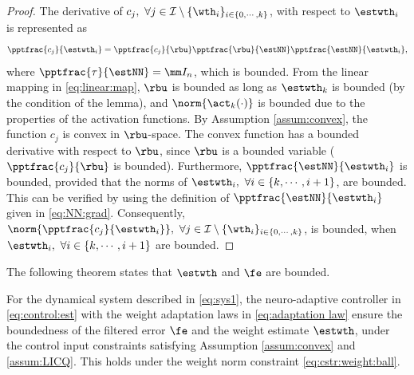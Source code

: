\documentclass[journal]{IEEEtran}
\begin{document}
\begin{proof}

The derivative of $c_j,\ \forall j\in\mathcal I \setminus \{\wth_i\}_{i\in\{0,\cdots,k\}}$, with respect to $\estwth_i$ is represented as
\begin{equation}
    \pptfrac{c_j}{\estwth_i} 
    = 
    \pptfrac{c_j}{\rbu} 
    \pptfrac{\rbu}{\estNN} 
    \pptfrac{\estNN}{\estwth_i}
    ,
\end{equation}
where $\pptfrac{\tau}{\estNN}=\mm I_n$, which is bounded. 
From the linear mapping in \eqref{eq:linear:map}, $\rbu$ is bounded as long as $\estwth_k$ is bounded (by the condition of the lemma), and $\norm{\act_k(\cdot)}$ is bounded due to the properties of the activation functions. 
By Assumption \ref{assum:convex}, the function $c_j$ is convex in $\rbu$-space.
The convex function has a bounded derivative with respect to $\rbu$, since $\rbu$ is a bounded variable (\ie $\pptfrac{c_j}{\rbu}$ is bounded). 
Furthermore, $\pptfrac{\estNN}{\estwth_i}$ is bounded, provided that the norms of $\estwth_i,\ \forall i \in\{k,\cdots,i+1\}$, are bounded. 
This can be verified by using the definition of $\pptfrac{\estNN}{\estwth_i}$ given in \eqref{eq:NN:grad}.
Consequently, $\norm{\pptfrac{c_j}{\estwth_i}},\ \forall j\in\mathcal I \setminus \{\wth_i\}_{i\in\{0,\cdots,k\}}$, is bounded, when $\estwth_i,\ \forall i\in \{k,\cdots,i+1\}$ are bounded.

\end{proof}

The following theorem states that $\estwth$ and $\fe$ are bounded.

\begin{theorem}
    For the dynamical system described in \eqref{eq:sys1}, the neuro-adaptive controller in \eqref{eq:control:est} with the weight adaptation laws in \eqref{eq:adaptation law} ensure the boundedness of the filtered error $\fe$ and the weight estimate $\estwth$, under the control input constraints satisfying Assumption \ref{assum:convex} and \ref{assum:LICQ}.
    This holds under the weight norm constraint \eqref{eq:cstr:weight:ball}.
\end{theorem}
\end{document}
